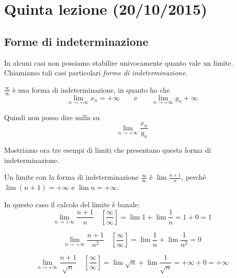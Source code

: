 \chapter{Quinta lezione (20/10/2015)}

\section{Forme di indeterminazione}

In alcuni casi non possiamo stabilire univocamente quanto vale un limite. Chiamiamo tali casi particolari \emph{forme di indeterminazione}. 

$\frac{\infty}{\infty}$ è una forma di indeterminazione, in quanto ho che
\begin{equation*}
\lim_{n \to +\infty}{x_n} = +\infty \qquad \text{e} \qquad \lim_{n \to +\infty}{y_n} + \infty
\end{equation*}

Quindi non posso dire nulla su
\begin{equation*}
\lim_{n \to +\infty}{\frac{x_n}{y_n}}
\end{equation*}

Mostriamo ora tre esempi di limiti che presentano questa forma di indeterminazione.
\begin{example}
Un limite con la forma di indeterminazione $\frac{\infty}{\infty}$ è $\lim{\frac{n+1}{n}}$, perché $\lim(n+1) = +\infty$ e $\lim n = +\infty$.

In questo caso il calcolo del limite è banale:
\begin{equation*}
\lim_{n \to +\infty}{\frac{n+1}{n}} \quad \left[\frac{\infty}{\infty}\right] = \lim 1 + \lim{\frac{1}{n}} = 1 + 0 = 1
\end{equation*}
\end{example}

\begin{example}
\begin{equation*}
\lim_{n \to +\infty}{\frac{n+1}{n^2}} \quad \left[\frac{\infty}{\infty}\right] = \lim \frac{1}{n} + \lim{\frac{1}{n^2}} = 0
\end{equation*}
\end{example}

\begin{example}
\begin{equation*}
\lim_{n \to +\infty}{\frac{n+1}{\sqrt{n}}} \quad \left[\frac{\infty}{\infty}\right] = \lim \sqrt{n} + \lim{\frac{1}{\sqrt{n}}} = +\infty + 0 = +\infty
\end{equation*}
\end{example}

